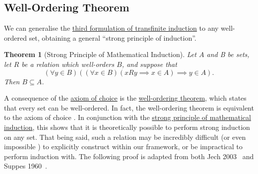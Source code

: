 \documentclass[a4paper,11pt]{article}
\theoremstyle{plain}
\newtheorem{thm}{Theorem}[subsection]
\theoremstyle{definition}
\theoremstyle{remark}
\begin{document}
\subsection{Well-Ordering Theorem}
We can generalise the \hyperref[thm:Tinduction3]{third formulation of transfinite induction} to any well-ordered set, obtaining a general ``strong principle of induction''.
\begin{thm}[Strong Principle of Mathematical Induction]
\label{thm:StrongInduction}
Let $A$ and B be sets, let $R$ be a relation which well-orders $B$, and suppose that
\[(\forall y\in B)((\forall x\in B)(xRy \implies x \in A) \implies y \in A).\]
Then $B \subseteq A$.
\end{thm}

A consequence of the \hyperref[axiom:choice]{axiom of choice} is the \hyperref[thm:WellOrderingTheorem]{well-ordering theorem}, which states that every set can be well-ordered. In fact, the well-ordering theorem is equivalent to the axiom of choice \citep[pp. 243 -- 251]{JechBook}. In conjunction with the \hyperref[thm:StrongInduction]{strong principle of mathematical induction}, this shows that it is theoretically possible to perform strong induction on any set. That being said, such a relation may be incredibly difficult (or even impossible \citep{NoWellOrderReals}) to explicitly construct within our framework, or be impractical to perform induction with. The following proof is adapted from both Jech 2003~\citep[p. 48]{JechBook} and Suppes 1960~\citep[pp. 241 -- 242]{SuppesBook}.
\end{document}
